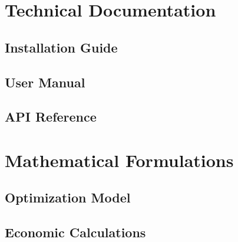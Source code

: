 \section{Technical Documentation}
\subsection{Installation Guide}
\subsection{User Manual}
\subsection{API Reference}

\section{Mathematical Formulations}
\subsection{Optimization Model}
\subsection{Economic Calculations} 